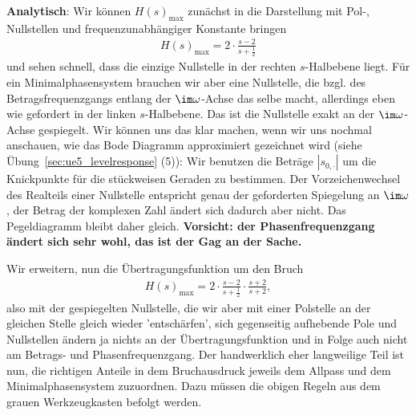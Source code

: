 \begin{ExCalc}
\textbf{Analytisch}:
Wir können $H(s)_\mathrm{max} $ zunächst in die Darstellung mit
Pol-, Nullstellen und frequenzunabhängiger Konstante bringen
\begin{align}
H(s)_\mathrm{max} = 2\cdot\frac{s-2}{s+\frac{1}{2}}
\end{align}
und sehen schnell, dass die einzige Nullstelle in der rechten $s$-Halbebene liegt.
Für ein Minimalphasensystem brauchen wir aber eine Nullstelle, die bzgl. des
Betragsfrequenzgangs entlang der $\im\omega$-Achse das selbe macht, allerdings
eben wie gefordert in der linken $s$-Halbebene.
Das ist die Nullstelle exakt an der $\im\omega$-Achse gespiegelt.
Wir können uns das klar machen, wenn wir uns nochmal anschauen, wie das Bode
Diagramm approximiert gezeichnet wird (siehe Übung~\ref{sec:ue5_levelresponse} (5)):
Wir benutzen die Beträge $|s_{0,\cdot}|$ um die Knickpunkte für
die stückweisen Geraden zu bestimmen.
Der Vorzeichenwechsel des Realteils einer Nullstelle entspricht genau der
geforderten Spiegelung an $\im\omega$, der Betrag der komplexen Zahl ändert
sich dadurch aber nicht. Das Pegeldiagramm bleibt daher gleich. \textbf{Vorsicht: der
Phasenfrequenzgang ändert sich sehr wohl, das ist der Gag an der Sache.}

Wir erweitern,
nun die Übertragungsfunktion um den Bruch
\begin{align}
H(s)_\mathrm{max} = 2\cdot\frac{s-2}{s+\frac{1}{2}} \cdot \frac{s+2}{s+2},
\end{align}
also mit der gespiegelten Nullstelle, die wir aber mit einer Polstelle
an der gleichen Stelle gleich wieder 'entschärfen', sich gegenseitig aufhebende Pole und Nullstellen
ändern ja nichts an der Übertragungsfunktion und in Folge auch nicht am Betrags-
und Phasenfrequenzgang.
Der handwerklich eher langweilige Teil ist nun, die richtigen Anteile in dem Bruchausdruck
jeweils dem Allpass und dem Minimalphasensystem zuzuordnen.
Dazu müssen die obigen Regeln aus dem grauen Werkzeugkasten befolgt werden.


\end{ExCalc}
